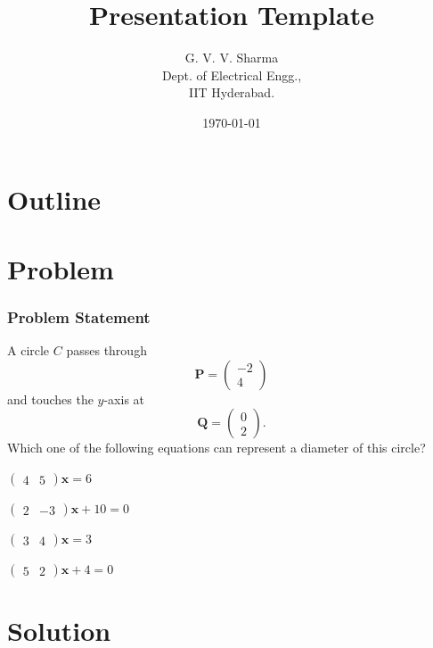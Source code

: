 \documentclass{beamer}
\title{Presentation Template}
\author{G. V. V. Sharma \\ Dept. of Electrical Engg.,\\IIT Hyderabad.}
\date{\today}
\theoremstyle{remark}
\newcommand{\myvec}[1]{\ensuremath{\begin{pmatrix}#1\end{pmatrix}}}
\let\vec\mathbf
\begin{document}
\begin{frame}
\titlepage
\end{frame}

\section*{Outline}
\begin{frame}
\tableofcontents
\end{frame}
\section{Problem}
\begin{frame}
\frametitle{Problem Statement}
A circle $C$ passes through 
\begin{equation} 
\vec{P}=\myvec{-2\\ 4} 
\label{eq:circle_7_p}
\end{equation} 
and touches the $y$-axis at 
\begin{equation} 
\vec{Q}=\myvec{0\\ 2}. 
\label{eq:circle_7_q}
\end{equation}
Which one of the  following equations can represent a diameter of this circle?
\begin{enumerate}[label=(\roman*)]
\begin{multicols}{2}
\setlength\itemsep{1em}
\item $\myvec{4 & 5}\vec{x} = 6 $
\item $\myvec{2 & -3}\vec{x} +10 = 0 $
\item $\myvec{3 & 4}\vec{x} = 3 $
\item $\myvec{5 & 2}\vec{x} +4= 0 $
\end{multicols}
\end{enumerate}
\end{frame}

\section{Solution}
\end{document}
